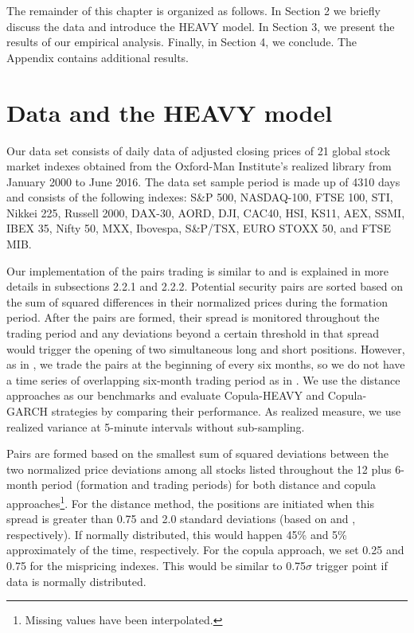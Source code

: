 \documentclass[a4paper,12pt]{report}
\begin{document}
\begin{refsection}
The remainder of this chapter is organized as follows. In Section 2 we briefly discuss the data and introduce the HEAVY model. In Section 3, we present the results of our empirical analysis. Finally, in Section 4, we conclude. The Appendix contains additional results.

\vspace{0.6cm}

\section{Data and the HEAVY model}
\label{section2}

Our data set consists of daily data of adjusted closing prices of 21 global stock market indexes obtained from the Oxford-Man Institute's realized library from January 2000 to June 2016. The data set sample period is made up of 4310 days and consists of the following indexes: S\&P 500, NASDAQ-100, FTSE 100, STI, Nikkei 225, Russell 2000, DAX-30, AORD, DJI, CAC40, HSI, KS11, AEX, SSMI, IBEX 35, Nifty 50, MXX, Ibovespa, S\&P/TSX, EURO STOXX 50, and FTSE MIB.

Our implementation of the pairs trading is similar to \citet*{ggr06} and is explained in more details in subsections 2.2.1 and 2.2.2. Potential security pairs are sorted based on the sum of squared differences in their normalized prices during the formation period. After the pairs are formed, their spread is monitored throughout the trading period and any deviations beyond a certain threshold in that spread would trigger the opening of two simultaneous long and short positions. However, as in \citet*{bv12}, we trade the pairs at the beginning of every six months, so we do not have a time series of overlapping six-month trading period as in \citet*{ggr06}. We use the distance approaches as our benchmarks and evaluate Copula-HEAVY and Copula-GARCH strategies by comparing their performance. As realized measure, we use realized variance at 5-minute intervals without sub-sampling.

Pairs are formed based on the smallest sum of squared deviations between the two normalized price deviations among all stocks listed throughout the 12 plus 6-month period (formation and trading periods) for both distance and copula approaches\footnote{%
	Missing values have been interpolated.}. For the distance method, the positions are initiated when this spread is greater than 0.75 and 2.0 standard deviations (based on \citet*{v04} and \citet*{ggr06}, respectively). If normally distributed, this would happen 45\% and 5\% approximately of the time, respectively. For the copula approach, we set 0.25 and 0.75 for the mispricing indexes. This would be similar to 0.75$\sigma$ trigger point if data is normally distributed.


\end{refsection}
\end{document}
